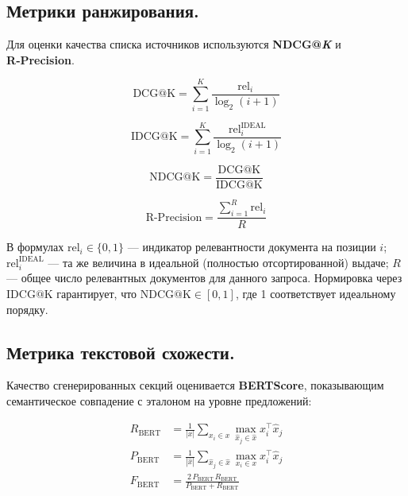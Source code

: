 \documentclass{article}
\theoremstyle{definition}
\theoremstyle{plain}
\begin{document}
\subsection*{Метрики ранжирования.}

Для оценки качества списка источников используются \textbf{NDCG@\textit{K}} и \textbf{R‑Precision}.

\begin{equation}
\mathrm{DCG@K}= \sum_{i=1}^{K} \frac{\mathrm{rel}_i}{\log_2(i+1)}\tag{3}
\end{equation}

\begin{equation}
\mathrm{IDCG@K}= \sum_{i=1}^{K} \frac{\mathrm{rel}^{\mathrm{IDEAL}}_i}{\log_2(i+1)}\tag{4}
\end{equation}

\begin{equation}
\mathrm{NDCG@K}= \frac{\mathrm{DCG@K}}{\mathrm{IDCG@K}}\tag{5}
\end{equation}

\begin{equation}
\mathrm{R\text{-}Precision}= \frac{\sum_{i=1}^{R} \mathrm{rel}_i}{R}\tag{6}
\end{equation}

В формулах \(\mathrm{rel}_i\in\{0,1\}\) — индикатор релевантности документа на позиции \(i\);  
\(\mathrm{rel}^{\mathrm{IDEAL}}_i\) — та же величина в идеальной (полностью отсортированной) выдаче;  
\(R\) — общее число релевантных документов для данного запроса.  
Нормировка через \(\mathrm{IDCG@K}\) гарантирует, что \(\mathrm{NDCG@K}\in[0,1]\), где 1 соответствует идеальному порядку.

\subsection*{Метрика текстовой схожести.}

Качество сгенерированных секций оценивается \textbf{BERTScore}, показывающим семантическое совпадение с эталоном на уровне предложений:

\begin{align}
R_{\mathrm{BERT}} &= \frac{1}{|x|}\sum_{x_i\in x}\max_{\hat{x}_j\in\hat{x}} x_i^\top \hat{x}_j\tag{7}\\
P_{\mathrm{BERT}} &= \frac{1}{|\hat{x}|}\sum_{\hat{x}_j\in\hat{x}}\max_{x_i\in x} x_i^\top \hat{x}_j\tag{8}\\
F_{\mathrm{BERT}} &= \frac{2\,P_{\mathrm{BERT}}\,R_{\mathrm{BERT}}}{P_{\mathrm{BERT}} + R_{\mathrm{BERT}}}\tag{9}
\end{align}
\end{document}
